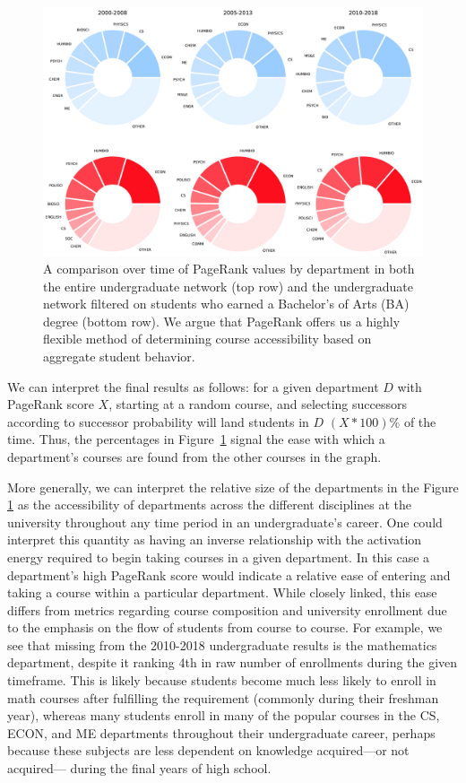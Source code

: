 \documentclass{sigchi}
\begin{document}
\begin{figure}
    \centering
    \includegraphics[width=\columnwidth]{Figs/final-evolution.pdf}
    \caption{A comparison over time of PageRank values by department in both the entire undergraduate network (top row) and the undergraduate network filtered on students who earned a Bachelor's of Arts (BA) degree (bottom row). We argue that PageRank offers us a highly flexible method of determining course accessibility based on aggregate student behavior.}
    \label{fig:evolution}
\end{figure}

We can interpret the final results as follows: for a given department
$D$ with PageRank score $X$, starting at a random course, and
selecting successors according to successor probability will land
students in $D$ $(X * 100)$\% of the time. Thus, the percentages in
Figure~\ref{fig:evolution} signal the ease with which a department's
courses are found from the other courses in the graph.

More generally, we can interpret the relative size of the departments
in the Figure \ref{fig:evolution} as the accessibility of departments
across the different disciplines at the university throughout any time
period in an undergraduate's career. One could interpret this quantity
as having an inverse relationship with the activation energy required to
begin taking courses in a given department. In this case a
department's high PageRank score would indicate a relative ease of
entering and taking a course within a particular department. While
closely linked, this ease differs from metrics regarding course
composition and university enrollment due to the emphasis on the flow
of students from course to course. For example, we see that missing
from the 2010-2018 undergraduate results is the mathematics
department, despite it ranking 4th in raw number of enrollments during
the given timeframe. This is likely because students become much less
likely to enroll in math courses after fulfilling the requirement
(commonly during their freshman year), whereas many students enroll in
many of the popular courses in the CS, ECON, and ME departments
throughout their undergraduate career, perhaps because these subjects
are less dependent on knowledge acquired---or not acquired--- during
the final years of high school.
\end{document}
